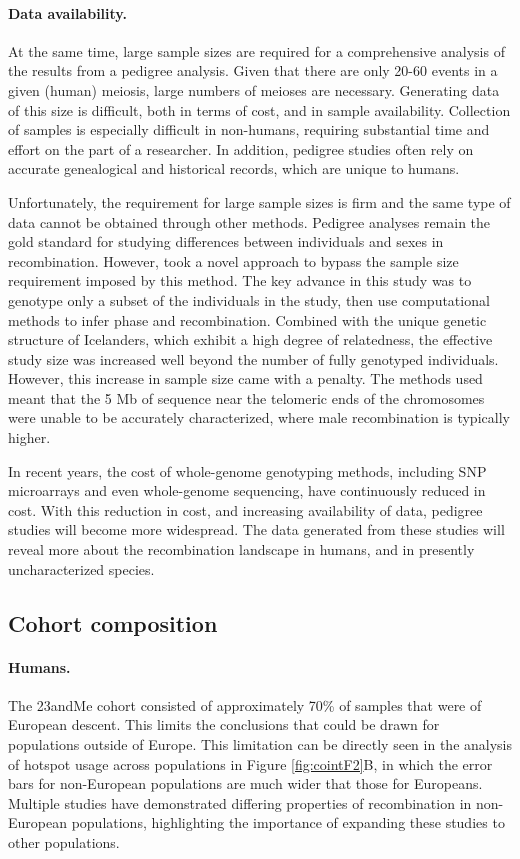 \paragraph{Data availability.}
At the same time, large sample sizes are required for a comprehensive analysis of the results from a pedigree analysis.
Given that there are only 20-60 events in a given (human) meiosis\cite{Broman1998,Coop2008,Kong2010}, large numbers of meioses are necessary.
Generating data of this size is difficult, both in terms of cost, and in sample availability.
Collection of samples is especially difficult in non-humans, requiring substantial time and effort on the part of a researcher.
In addition, pedigree studies often rely on accurate genealogical and historical records, which are unique to humans.

Unfortunately, the requirement for large sample sizes is firm and the same type of data cannot be obtained through other methods.
Pedigree analyses remain the gold standard for studying differences between individuals and sexes in recombination.
However, \citet{Kong2010} took a novel approach to bypass the sample size requirement imposed by this method.
The key advance in this study was to genotype only a subset of the individuals in the study, then use computational methods to infer phase and recombination.
Combined with the unique genetic structure of Icelanders, which exhibit a high degree of relatedness, the effective study size was increased well beyond the number of fully genotyped individuals.
However, this increase in sample size came with a penalty.
The methods used meant that the 5 Mb of sequence near the telomeric ends of the chromosomes were unable to be accurately characterized, where male recombination is typically higher.

In recent years, the cost of whole-genome genotyping methods, including SNP microarrays and even whole-genome sequencing, have continuously reduced in cost.
With this reduction in cost, and increasing availability of data, pedigree studies will become more widespread.
The data generated from these studies will reveal more about the recombination landscape in humans, and in presently uncharacterized species.

\subsection{Cohort composition}
\paragraph{Humans.}
The 23andMe cohort consisted of approximately 70\% of samples that were of European descent.
This limits the conclusions that could be drawn for populations outside of Europe.
This limitation can be directly seen in the analysis of hotspot usage across populations in Figure \ref{fig:cointF2}B, in which the error bars for non-European populations are much wider that those for Europeans.
Multiple studies have demonstrated differing properties of recombination in non-European populations\cite{Bleazard2013,Hinch2011,Berg2011}, highlighting the importance of expanding these studies to other populations.

